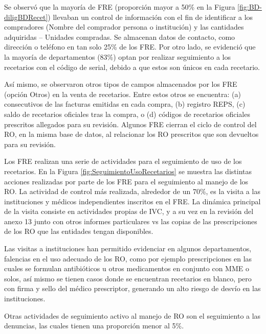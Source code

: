 \documentclass[
]{book}
\begin{document}
Se observó que la mayoría de FRE (proporción mayor a 50\% en la Figura \ref{fig:BD-diligBDRecet}) llevaban un control de información con el fin de identificar a los compradores (Nombre del comprador persona o institución) y las cantidades adquiridas -- Unidades compradas. Se almacenan datos de contacto, como dirección o teléfono en tan solo 25\% de los FRE. Por otro lado, se evidenció que la mayoría de departamentos (83\%) optan por realizar seguimiento a los recetarios con el código de serial, debido a que estos son únicos en cada recetario.

Así mismo, se observaron otros tipos de campos almacenados por los FRE (opción Otros) en la venta de recetarios. Entre estos otros se encuentra: (a) consecutivos de las facturas emitidas en cada compra, (b) registro REPS, (c) saldo de recetarios oficiales tras la compra, o (d) códigos de recetarios oficiales prescritos allegados para su revisión. Algunos FRE cierran el ciclo de control del RO, en la misma base de datos, al relacionar los RO prescritos que son devueltos para su revisión.

Los FRE realizan una serie de actividades para el seguimiento de uso de los recetarios. En la Figura \ref{fig:SeguimientoUsoRecetarios} se muestra las distintas acciones realizadas por parte de los FRE para el seguimiento al manejo de los RO. La actividad de control más realizada, alrededor de un 70\%, es la visita a las instituciones y médicos independientes inscritos en el FRE. La dinámica principal de la visita consiste en actividades propias de IVC, y a su vez en la revisión del anexo 13 junto con otros informes particulares vs las copias de las prescripciones de los RO que las entidades tengan disponibles.

Las visitas a instituciones han permitido evidenciar en algunos departamentos, falencias en el uso adecuado de los RO, como por ejemplo prescripciones en las cuales se formulan antibióticos u otros medicamentos en conjunto con MME o solos, así mismo se tienen casos donde se encuentran recetarios en blanco, pero con firma y sello del médico prescriptor, generando un alto riesgo de desvío en las instituciones.

Otras actividades de seguimiento activo al manejo de RO son el seguimiento a las denuncias, las cuales tienen una proporción menor al 5\%.
\end{document}
